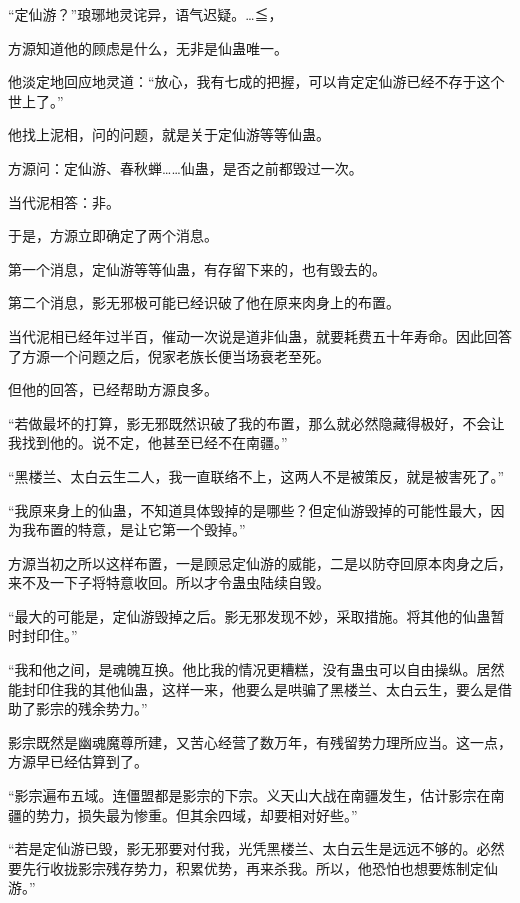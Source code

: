 
\begin{this_body}

“定仙游？”琅琊地灵诧异，语气迟疑。…≦，

方源知道他的顾虑是什么，无非是仙蛊唯一。

他淡定地回应地灵道：“放心，我有七成的把握，可以肯定定仙游已经不存于这个世上了。”

他找上泥相，问的问题，就是关于定仙游等等仙蛊。

方源问：定仙游、春秋蝉……仙蛊，是否之前都毁过一次。

当代泥相答：非。

于是，方源立即确定了两个消息。

第一个消息，定仙游等等仙蛊，有存留下来的，也有毁去的。

第二个消息，影无邪极可能已经识破了他在原来肉身上的布置。

当代泥相已经年过半百，催动一次说是道非仙蛊，就要耗费五十年寿命。因此回答了方源一个问题之后，倪家老族长便当场衰老至死。

但他的回答，已经帮助方源良多。

“若做最坏的打算，影无邪既然识破了我的布置，那么就必然隐藏得极好，不会让我找到他的。说不定，他甚至已经不在南疆。”

“黑楼兰、太白云生二人，我一直联络不上，这两人不是被策反，就是被害死了。”

“我原来身上的仙蛊，不知道具体毁掉的是哪些？但定仙游毁掉的可能性最大，因为我布置的特意，是让它第一个毁掉。”

方源当初之所以这样布置，一是顾忌定仙游的威能，二是以防夺回原本肉身之后，来不及一下子将特意收回。所以才令蛊虫陆续自毁。

“最大的可能是，定仙游毁掉之后。影无邪发现不妙，采取措施。将其他的仙蛊暂时封印住。”

“我和他之间，是魂魄互换。他比我的情况更糟糕，没有蛊虫可以自由操纵。居然能封印住我的其他仙蛊，这样一来，他要么是哄骗了黑楼兰、太白云生，要么是借助了影宗的残余势力。”

影宗既然是幽魂魔尊所建，又苦心经营了数万年，有残留势力理所应当。这一点，方源早已经估算到了。

“影宗遍布五域。连僵盟都是影宗的下宗。义天山大战在南疆发生，估计影宗在南疆的势力，损失最为惨重。但其余四域，却要相对好些。”

“若是定仙游已毁，影无邪要对付我，光凭黑楼兰、太白云生是远远不够的。必然要先行收拢影宗残存势力，积累优势，再来杀我。所以，他恐怕也想要炼制定仙游。”


\end{this_body}
